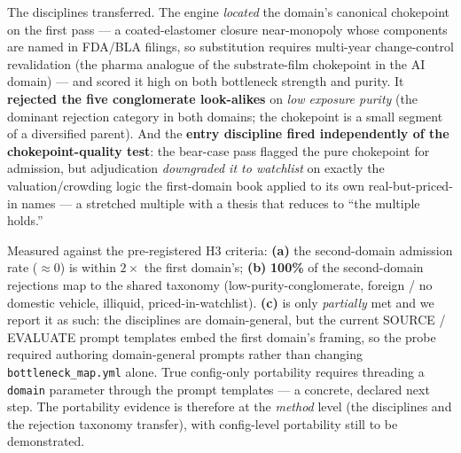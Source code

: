 \documentclass[11pt]{article}
\begin{document}
The disciplines transferred. The engine \emph{located} the domain's canonical
chokepoint on the first pass --- a coated-elastomer closure near-monopoly whose
components are named in FDA/BLA filings, so substitution requires multi-year
change-control revalidation (the pharma analogue of the substrate-film chokepoint
in the AI domain) --- and scored it high on both bottleneck strength and purity.
It \textbf{rejected the five conglomerate look-alikes} on \emph{low exposure
purity} (the dominant rejection category in both domains; the chokepoint is a
small segment of a diversified parent). And the \textbf{entry discipline fired
independently of the chokepoint-quality test}: the bear-case pass flagged the pure
chokepoint for admission, but adjudication \emph{downgraded it to watchlist} on
exactly the valuation/crowding logic the first-domain book applied to its own
real-but-priced-in names --- a stretched multiple with a thesis that reduces to
``the multiple holds.''

Measured against the pre-registered H3 criteria: \textbf{(a)} the second-domain
admission rate ($\approx 0$) is within $2\times$ the first domain's; \textbf{(b)}
\textbf{100\%} of the second-domain rejections map to the shared taxonomy
(low-purity-conglomerate, foreign / no domestic vehicle, illiquid,
priced-in-watchlist). \textbf{(c)} is only \emph{partially} met and we report it
as such: the disciplines are domain-general, but the current SOURCE / EVALUATE
prompt templates embed the first domain's framing, so the probe required authoring
domain-general prompts rather than changing \texttt{bottleneck\_map.yml} alone.
True config-only portability requires threading a \texttt{domain} parameter through
the prompt templates --- a concrete, declared next step. The portability evidence
is therefore at the \emph{method} level (the disciplines and the rejection taxonomy
transfer), with config-level portability still to be demonstrated.
\end{document}
